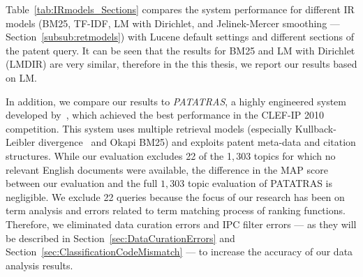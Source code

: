 Table~\ref{tab:IRmodels_Sections} compares the system performance for different IR models 
(BM25, TF-IDF, LM with Dirichlet, and Jelinek-Mercer smoothing --- Section~\ref{subsub:retmodels}) with Lucene default settings and different sections of the patent query.
It can be seen that the results for BM25 and LM with Dirichlet (LMDIR) are very similar, therefore in the this thesis, we report our results based on LM.    


In addition, we compare our results to \textit{PATATRAS}, a highly engineered system developed by~\cite{lopez2010experiments}, which achieved the best performance in the CLEF-IP 2010 competition. This system uses multiple retrieval models (especially Kullback-Leibler divergence~\citep{Baeza-Yates2011} and Okapi BM25) and exploits patent meta-data and citation structures. While our evaluation excludes 22 of the 1$,303$ topics for which no relevant English documents were available, the difference in the MAP score between our evaluation and the full $1,303$ topic evaluation of PATATRAS is negligible. We exclude 22 queries because the focus of our research has been on term analysis and errors related to term matching process of ranking functions. Therefore, we eliminated data curation errors and IPC filter errors --- as they will be described in Section~\ref{sec:DataCurationErrors} and Section~\ref{sec:ClassificationCodeMismatch} --- to increase the accuracy of our data analysis results. 
% 

